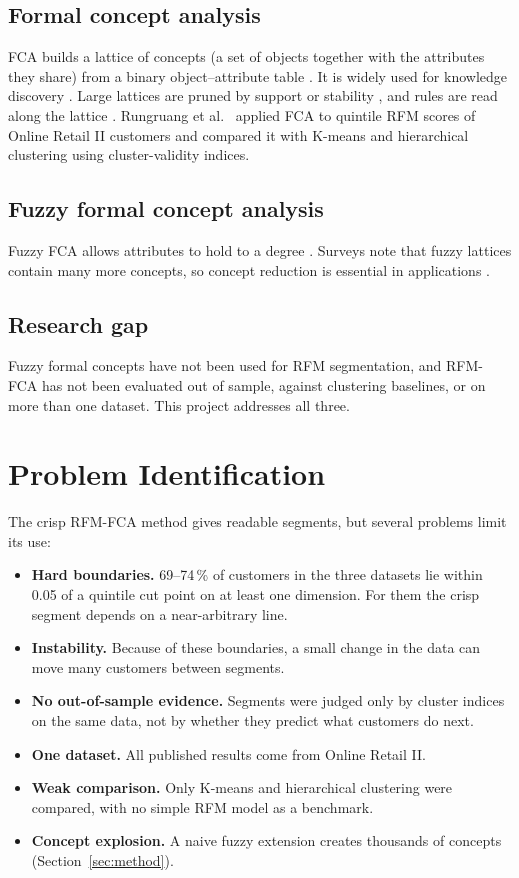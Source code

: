 \documentclass[11pt,a4paper]{article}
\begin{document}
\subsection{Formal concept analysis}
FCA builds a lattice of concepts (a set of objects together with the attributes they share) from a binary object--attribute table \cite{ganter1999}. It is widely used for knowledge discovery \cite{poelmans2013app,singh2016}. Large lattices are pruned by support or stability \cite{kuznetsov2007}, and rules are read along the lattice \cite{luxenburger1991}. Rungruang et al.\ \cite{rungruang2024} applied FCA to quintile RFM scores of Online Retail II customers and compared it with K-means and hierarchical clustering using cluster-validity indices.

\subsection{Fuzzy formal concept analysis}
Fuzzy FCA allows attributes to hold to a degree \cite{burusco1994,pollandt1997,belohlavek2002,belohlavek2004}. Surveys note that fuzzy lattices contain many more concepts, so concept reduction is essential in applications \cite{poelmans2014,alwersh2022}.

\subsection{Research gap}
Fuzzy formal concepts have not been used for RFM segmentation, and RFM-FCA has not been evaluated out of sample, against clustering baselines, or on more than one dataset. This project addresses all three.

\newpage
\section{Problem Identification}

The crisp RFM-FCA method gives readable segments, but several problems limit its use:

\begin{itemize}
\item \textbf{Hard boundaries.} 69--74\,\% of customers in the three datasets lie within 0.05 of a quintile cut point on at least one dimension. For them the crisp segment depends on a near-arbitrary line.
\item \textbf{Instability.} Because of these boundaries, a small change in the data can move many customers between segments.
\item \textbf{No out-of-sample evidence.} Segments were judged only by cluster indices on the same data, not by whether they predict what customers do next.
\item \textbf{One dataset.} All published results come from Online Retail II.
\item \textbf{Weak comparison.} Only K-means and hierarchical clustering were compared, with no simple RFM model as a benchmark.
\item \textbf{Concept explosion.} A naive fuzzy extension creates thousands of concepts (Section~\ref{sec:method}).
\end{itemize}
\end{document}
